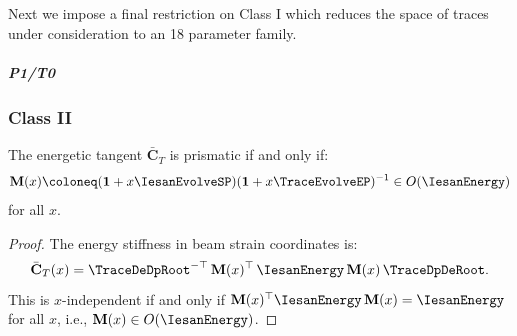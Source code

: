Next we impose a final restriction on Class I which reduces the space of traces under consideration to an 18 parameter family.

\subparagraph{P1/T0}

\subsubsection{Class II}
\begin{Aside}
\begin{proposition}
The energetic tangent $\bar{\mathbf{C}}_T$ is prismatic if and only if:
\begin{equation*}
\mathbf{M}(x) \coloneq 
(\mathbf{1} + x\IesanEvolveSP)(\mathbf{1} + x\TraceEvolveEP)^{-1} \in O(\IesanEnergy)
\end{equation*}
for all $x$.
\end{proposition}

\begin{proof}
The energy stiffness in beam strain coordinates is:
\begin{equation*}
\bar{\mathbf{C}}_T(x) = \TraceDeDpRoot^{-\top}\,\mathbf{M}(x)^\top\, 
\IesanEnergy \, \mathbf{M}(x)\,\TraceDpDeRoot.
\end{equation*}
This is $x$-independent if and only if 
$\mathbf{M}(x)^\top \IesanEnergy\, \mathbf{M}(x) = \IesanEnergy$ 
for all $x$, i.e., $\mathbf{M}(x) \in O(\IesanEnergy)$.
\end{proof}
\end{Aside}
